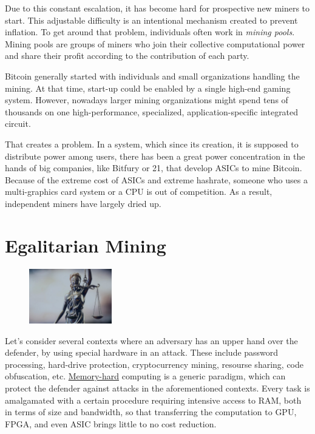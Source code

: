 Due to this constant escalation, it has become hard for prospective new miners to start. This adjustable difficulty is an intentional mechanism created to prevent inflation. To get around that problem, individuals often work in \emph{mining pools}. Mining pools are groups of miners who join their collective computational power and share their profit according to the contribution of each party.

Bitcoin generally started with individuals and small organizations handling the mining. At that time, start-up could be enabled by a single high-end gaming system. However, nowadays larger mining organizations might spend tens of thousands on one high-performance, specialized, application-specific integrated circuit.

That creates a problem. In a system, which since its creation, it is supposed to distribute power among users, there has been a great power concentration in the hands of big companies, like Bitfury or 21, that develop ASICs to mine Bitcoin. Because of the extreme cost of ASICs and extreme hashrate, someone who uses a multi-graphics card system or a CPU is out of competition. As a result, independent miners have largely dried up.

\section{Egalitarian Mining} \label{sec:egalitarian}
\setlength{\intextsep}{0pt}
\begin{figure}
\centering
\includegraphics[width=0.32\textwidth]{Images/Mining/justice.jpg}
\end{figure}
Let's consider several contexts where an adversary has an upper hand over the defender, by using special hardware in an attack. These include password processing, hard-drive protection, cryptocurrency mining, resourse sharing, code obfuscation, etc. \hyperref[sec:memory-hard]{Memory-hard} computing is a generic paradigm, which can protect the defender against attacks in the aforementioned contexts. Every task is amalgamated with a certain procedure requiring intensive access to RAM, both in terms of size and bandwidth, so that transferring the computation to GPU, FPGA, and even ASIC brings little to no cost reduction.

